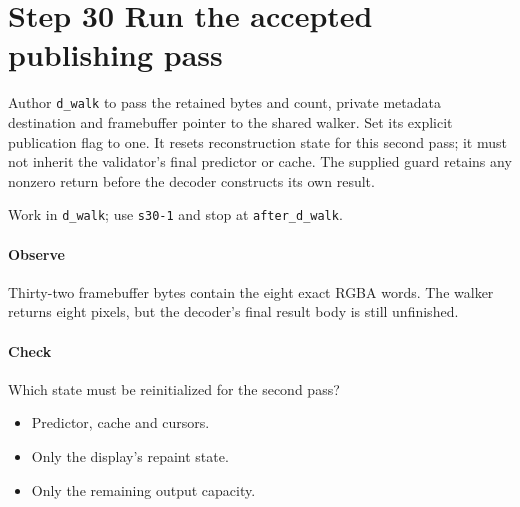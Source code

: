 \section{Step 30 Run the accepted publishing pass}\label{qoi-s30}
Author \texttt{d\_walk} to pass the retained bytes and count, private metadata destination and framebuffer pointer to the shared walker. Set its explicit publication flag to one. It resets reconstruction state for this second pass; it must not inherit the validator’s final predictor or cache. The supplied guard retains any nonzero return before the decoder constructs its own result.

Work in \texttt{d\_walk}; use \texttt{s30-1} and stop at \texttt{after\_d\_walk}.

\paragraph{Observe} Thirty-two framebuffer bytes contain the eight exact RGBA words. The walker returns eight pixels, but the decoder’s final result body is still unfinished.

\paragraph{Check} Which state must be reinitialized for the second pass?
\begin{itemize}
\item[A.] Predictor, cache and cursors.
\item[B.] Only the display’s repaint state.
\item[C.] Only the remaining output capacity.
\end{itemize}
